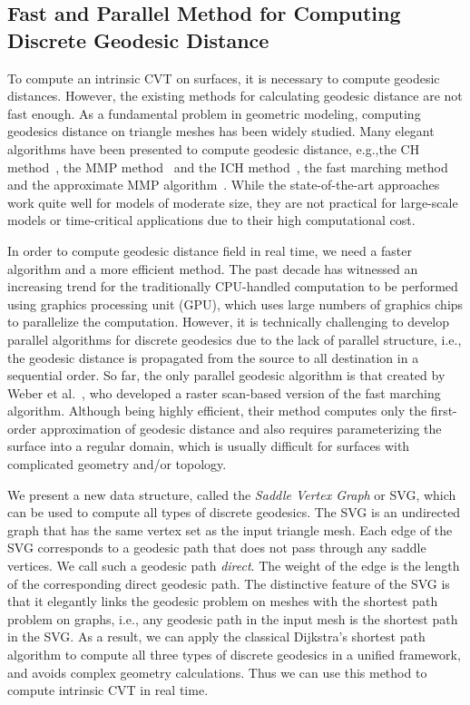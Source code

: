 \subsection{Fast and Parallel Method for Computing Discrete Geodesic Distance}
\label{subsec:svg}

To compute an intrinsic CVT on surfaces,
it is necessary to compute geodesic distances. However,
the existing methods for calculating geodesic distance
 are not fast enough.
As a fundamental problem in geometric modeling, computing geodesics
distance on triangle meshes has been widely studied.
 Many elegant algorithms have been presented to compute geodesic distance, e.g.,the CH
method~\cite{Chen_Han:1990}, the MMP
method~\cite{Mitchell_Etc:1987} and the ICH method~\cite{Xin_Wang:2009}, the fast marching
method~\cite{Kimmel_Sethian:1998} and the approximate MMP
algorithm~\cite{Surazhsky_Etc:2005}. While the state-of-the-art
approaches~\cite{Surazhsky_Etc:2005}~\cite{Xin_Wang:2009} work quite
well for models of moderate size, they are not practical for
large-scale models or time-critical applications due to their high
computational cost.

In order to compute geodesic distance field in real time,
we need a faster algorithm and a more efficient method. The past decade
has witnessed an increasing trend for the
traditionally CPU-handled computation to be performed using
 graphics processing unit
(GPU), which uses large numbers of graphics chips to parallelize the
computation. However, it is technically challenging to develop
parallel algorithms for discrete geodesics due to the lack of
parallel structure, i.e., the geodesic distance is propagated from
the source to all destination in a sequential order. So far, the
only parallel geodesic algorithm is that created by Weber et
al.~\cite{weber2008parallel}, who developed a
raster scan-based version of the fast marching algorithm. Although
being highly efficient, their method computes only the first-order
approximation of geodesic distance and also requires parameterizing the
surface into a regular domain, which is usually difficult for
surfaces with complicated geometry and/or topology.

We present a new data structure, called the \textit{Saddle
Vertex Graph} or SVG, which can be used to compute all types of
discrete geodesics. The SVG is an undirected graph that has the same
vertex set as the input triangle mesh. Each edge of the SVG corresponds
to a geodesic path that does not pass through any saddle vertices.
We call such a geodesic path \textit{direct}. The weight of the edge
is the length of the corresponding direct geodesic path. The
distinctive feature of the SVG is that it elegantly links the geodesic
problem on meshes with the shortest path problem on graphs, i.e.,
any geodesic path in the input mesh is the shortest path in the SVG.
As a result, we can apply the classical Dijkstra's shortest path
algorithm to compute all three types of discrete geodesics in a
unified framework, and avoids complex geometry calculations. Thus we
can use this method to compute intrinsic CVT in real time.

